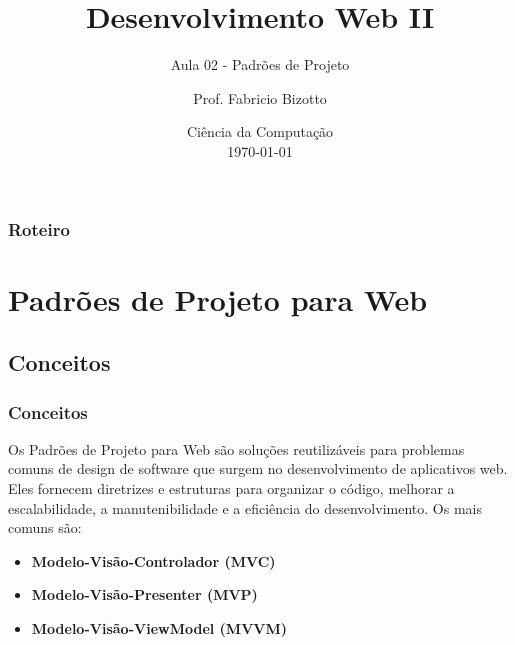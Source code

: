\documentclass[
	9pt, %
	t, %
]{beamer}
\title[DesWebII]{Desenvolvimento Web II} %
\subtitle{Aula 02 - Padrões de Projeto} %
\author[Fabricio Bizotto]{Prof. Fabricio Bizotto} %
\institute[IFC]{Instituto Federal Catarinense \\ \smallskip \textit{fabricio.bizotto@ifc.edu.br}} %
\date[\today]{Ciência da Computação \\ \today} %
\begin{document}

\begin{frame}
	\titlepage %
\end{frame}


\begin{frame}
	\frametitle{Roteiro} %

	\tableofcontents %
\end{frame}


\section{Padrões de Projeto para Web} %


\subsection{Conceitos}

\begin{frame}
	\frametitle{Conceitos}

	Os \alert{Padrões de Projeto para Web} são soluções reutilizáveis para
	problemas comuns de design de software que surgem no desenvolvimento de
	aplicativos web. Eles fornecem \alert{diretrizes e estruturas} para organizar o
	código, melhorar a escalabilidade, a manutenibilidade e a eficiência do
	desenvolvimento. Os mais comuns são:

	\begin{itemize}
		\item \textbf{Modelo-Visão-Controlador (MVC)}
		\item \textbf{Modelo-Visão-Presenter (MVP)}
		\item \textbf{Modelo-Visão-ViewModel (MVVM)}
	\end{itemize}
\end{frame}
\end{document}
